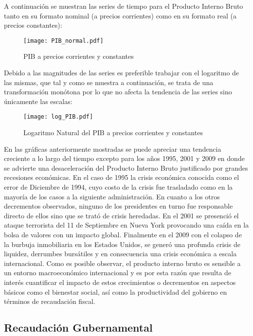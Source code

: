 A continuación se muestran las series de tiempo para el Producto Interno Bruto tanto en su formato nominal (a precios corrientes) como en su formato real (a precios constantes):


\begin{figure}[H]
\centering
\texttt{[image: PIB\_normal.pdf]}
\caption{PIB a precios corrientes y constantes}
\label{PIB_normal}
\end{figure}


Debido a las magnitudes de las series es preferible trabajar con el logaritmo de las mismas, que tal y como se muestra a continuación, se trata de una transformación monótona por lo que no afecta la tendencia de las series sino únicamente las escalas:


\begin{figure}[H]
\centering
\texttt{[image: log\_PIB.pdf]}
\caption{Logaritmo Natural del PIB a precios corrientes y constantes}
\label{log_PIB}
\end{figure}

En las gráficas anteriormente mostradas se puede apreciar una tendencia creciente a lo largo del tiempo excepto para los años 1995, 2001 y 2009 en donde se advierte una desaceleración del Producto Interno Bruto justificado por grandes recesiones económicas. En el caso de 1995 la crisis económica conocida como el error de Diciembre de 1994, cuyo costo de la crisis fue trasladado como en la mayoría de los casos a la siguiente administración. En cuanto a los otros decrementos observados, ninguno de los presidentes en turno fue responsable directo de ellos sino que se trató de crisis heredadas. En el 2001 se presenció el ataque terrorista del 11 de Septiembre en Nueva York  provocando una caída en la bolsa de valores con un impacto global. Finalmente en el  2009 con el colapso de la burbuja inmobiliaria en los Estados Unidos, se generó una profunda crisis de liquidez, derrumbes bursátiles y en consecuencia una crisis económica a escala internacional. Como es posible observar, el producto interno bruto es sensible a un entorno macroeconómico internacional y es por esta razón que resulta de interés cuantificar el impacto de estos crecimientos o decrementos en aspectos básicos como el bienestar social, así como la productividad del gobierno en términos de recaudación fiscal.





\subsection{Recaudación Gubernamental}


